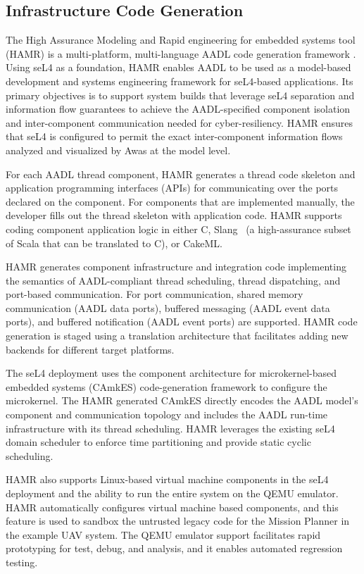 \subsection{Infrastructure Code Generation}

The High Assurance Modeling and Rapid engineering for embedded systems tool (HAMR) is a multi-platform, multi-language AADL code generation framework \cite{hamr}. 
Using seL4 as a foundation, HAMR enables AADL to be used as a model-based development and systems engineering framework for seL4-based applications.
Its primary objectives is to support system builds that leverage seL4 separation and information flow guarantees to achieve the AADL-specified component isolation and inter-component communication needed for cyber-resiliency.
HAMR ensures that seL4 is configured to permit the exact inter-component information flows analyzed and visualized by Awas at the model level.

For each AADL thread component, HAMR generates a thread code skeleton and application programming interfaces (APIs) for communicating over the ports declared on the component.
For components that are implemented manually, the developer fills out the thread skeleton with application code.
HAMR supports coding component application logic in either C, Slang~\cite{slang} (a high-assurance subset of Scala that can be translated to C), or CakeML. 

HAMR generates component infrastructure and integration code implementing the semantics of AADL-compliant thread scheduling, thread dispatching, and port-based communication.
For port communication, shared memory communication (AADL data ports), buffered messaging (AADL event data ports), and buffered notification (AADL event ports) are supported.
HAMR code generation is staged using a translation architecture that facilitates adding new backends for different target platforms.
 
The seL4 deployment uses the component architecture for microkernel-based embedded systems (CAmkES) code-generation framework to configure the microkernel.
The HAMR generated CAmkES directly encodes the AADL model's component and communication topology and includes the AADL run-time infrastructure with its thread scheduling.
HAMR leverages the existing seL4 domain scheduler to enforce time partitioning and provide static cyclic scheduling.

HAMR also supports Linux-based virtual machine components in the seL4 deployment and the ability to run the entire system on the QEMU emulator.
HAMR automatically configures virtual machine based components, and this feature is used to sandbox the untrusted legacy code for the Mission Planner in the example UAV system.
The QEMU emulator support facilitates rapid prototyping for test, debug, and analysis, and it enables automated regression testing.

